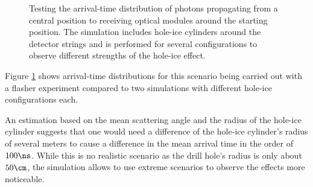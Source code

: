 \begin{figure}[htbp]
  \hfill
  \caption{Testing the arrival-time distribution of photons propagating from a central position to receiving optical modules around the starting position. The simulation includes hole-ice cylinders around the detector strings and is performed for several configurations to observe different strengths of the hole-ice effect.}
  \label{fig:eipau6Ag}
\end{figure}

Figure \ref{fig:eipau6Ag} shows arrival-time distributions for this scenario being carried out with a flasher experiment compared to two simulations with different hole-ice configurations each.


An estimation based on the mean scattering angle and the radius of the hole-ice cylinder suggests that one would need a difference of the hole-ice cylinder's radius of several meters to cause a difference in the mean arrival time in the order of $100\ns$. While this is no realistic scenario as the drill hole's radius is only about $50\cm$, the simulation allows to use extreme scenarios to observe the effects more noticeable.

